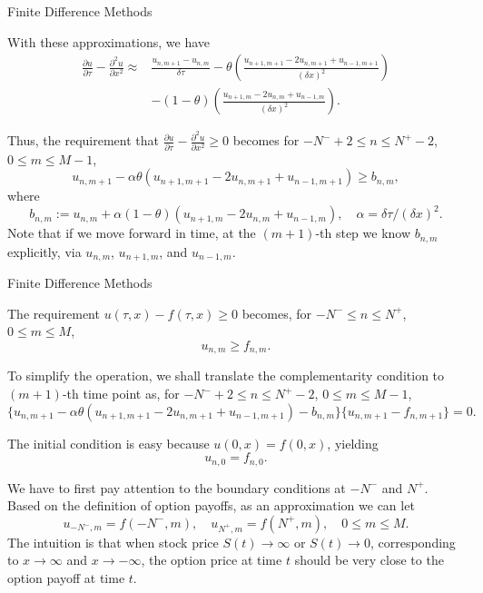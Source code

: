 \documentclass{beamer}
\begin{document}
\begin{frame}{Finite Difference Methods}

    {\footnotesize \footnotesize
    With these approximations, we have
    {\footnotesize \tiny
\begin{align*}
\frac{\partial u}{\partial \tau} - \frac{\partial^2 u}{\partial x^2} \approx & \frac{u_{n,m+1} - u_{n,m}}{\delta \tau} - \theta \left( \frac{u_{n+1,m+1} - 2u_{n,m+1} + u_{n-1,m+1}}{(\delta x)^2} \right) \\
& - (1 - \theta) \left( \frac{u_{n+1,m} - 2u_{n,m} + u_{n-1,m}}{(\delta x)^2} \right).
\end{align*}
    }

Thus, the requirement that $\frac{\partial u}{\partial \tau} - \frac{\partial^2 u}{\partial x^2} \geq 0$ becomes for $-N^- + 2 \leq n \leq N^+ - 2$, $0 \leq m \leq M - 1$,
\[
u_{n,m+1} - \alpha \theta (u_{n+1,m+1} - 2u_{n,m+1} + u_{n-1,m+1}) \geq b_{n,m}, 
\]
where
\[
b_{n,m} := u_{n,m} + \alpha (1 - \theta) (u_{n+1,m} - 2u_{n,m} + u_{n-1,m}),
 \quad \alpha = \delta\tau/(\delta x)^2.
\]
     Note that if we move forward in time, at the $(m + 1)$-th step we
     know $b_{n,m}$ explicitly, via $u_{n,m}$, $u_{n+1,m}$, and $u_{n-1,m}$.

    }
    
    
\end{frame}

\begin{frame}{Finite Difference Methods}

    {\footnotesize \footnotesize
     The requirement $u(\tau, x) - f(\tau, x) \geq 0$ becomes, for $-N^- \leq n \leq N^+$, $0 \leq m \leq M$,
\[
u_{n,m} \geq f_{n,m}. 
\]

To simplify the operation, we shall translate the complementarity condition to $(m + 1)$-th time point as, for $-N^- + 2 \leq n \leq N^+ - 2$, $0 \leq m \leq M - 1$,
\[
\{u_{n,m+1} - \alpha \theta (u_{n+1,m+1} - 2u_{n,m+1} + u_{n-1,m+1}) - b_{n,m}\} \{u_{n,m+1} - f_{n,m+1}\} = 0.
\]

The initial condition is easy because $u(0, x) = f(0, x)$, yielding
    \[
    u_{n, 0} = f_{n, 0}. 
    \]

    We have to first pay attention to the boundary conditions at $-N^{-}$ and $N^{+}$. 
    Based on the definition of option payoffs, as an approximation we can let
    \[
    u_{-N^{-},m} = f(-N^{-},m), \quad u_{N^{+},m} = f(N^{+},m), \quad 0 \leq m \leq M. 
    \]
     The intuition is that when stock price $S(t) \to \infty$ or $S(t) \to 0$, 
    corresponding to $x \to \infty$ and $x \to -\infty$, 
    the option price at time $t$ should be very close to the option payoff at time $t$.
    }
    
    
\end{frame}
\end{document}
